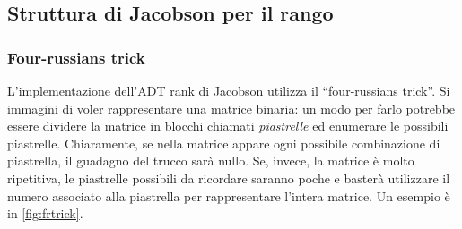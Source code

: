 \subsection{Struttura di Jacobson per il rango}
\subsubsection{Four-russians trick}
L'implementazione dell'ADT rank di Jacobson
utilizza il ``four-russians trick''. Si immagini di
voler rappresentare una matrice binaria: un modo per farlo potrebbe essere
dividere la matrice in blocchi chiamati \textit{piastrelle} ed enumerare
le possibili piastrelle. Chiaramente, se nella matrice appare ogni possibile
combinazione di piastrella, il guadagno del trucco sarà nullo.
Se, invece, la matrice è molto ripetitiva, le piastrelle possibili da ricordare saranno
poche e basterà utilizzare il numero associato alla piastrella per rappresentare
l'intera matrice. Un esempio è in \cref{fig:frtrick}.

